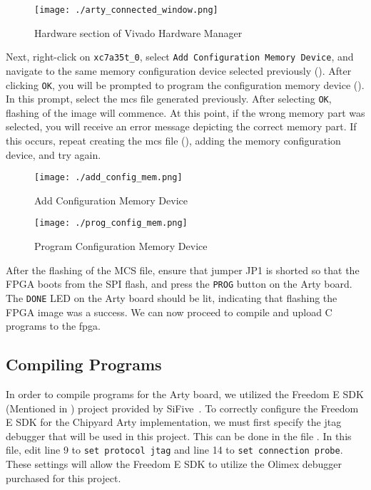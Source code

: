 \begin{figure}[h!tbp]
  \centering
  \texttt{[image: ./arty\_connected\_window.png]}
  \caption{Hardware section of Vivado Hardware Manager}
  \label{fig:Vivado_HW_connected}
\end{figure}

Next, right-click on \texttt{xc7a35t\_0}, select \texttt{Add Configuration Memory Device}, and navigate to the same memory configuration device selected previously ().
After clicking \texttt{OK}, you will be prompted to program the configuration memory device ().
In this prompt, select the \Gls{mcs} file generated previously.
After selecting \texttt{OK}, flashing of the image will commence.
At this point, if the wrong memory part was selected, you will receive an error message depicting the correct memory part.
If this occurs, repeat creating the \Gls{mcs} file (), adding the memory configuration device, and try again.

\begin{figure}[h!tbp]
  \centering
  \texttt{[image: ./add\_config\_mem.png]}
  \caption{Add Configuration Memory Device}
  \label{fig:add_config_mem}
\end{figure}

\begin{figure}[h!tbp]
  \centering
  \texttt{[image: ./prog\_config\_mem.png]}
  \caption{Program Configuration Memory Device}
  \label{fig:prog_config_mem}
\end{figure}

After the flashing of the MCS file, ensure that jumper JP1 is shorted so that the FPGA boots from the SPI flash, and press the \texttt{PROG} button on the Arty board.
The \texttt{DONE} LED on the Arty board should be lit, indicating that flashing the FPGA image was a success.
We can now proceed to compile and upload C programs to the \Gls{fpga}.

\subsection{Compiling Programs}\label{sec:Compiling_Programs}
In order to compile programs for the Arty board, we utilized the Freedom E SDK (Mentioned in ) project provided by SiFive~\cite{freedomESDK}.
To correctly configure the Freedom E SDK for the Chipyard Arty implementation, we must first specify the \Gls{jtag} debugger that will be used in this project.
This can be done in the file .
In this file, edit line 9 to \texttt{set protocol jtag} and line 14 to \texttt{set connection probe}.
These settings will allow the Freedom E SDK to utilize the Olimex debugger purchased for this project.

